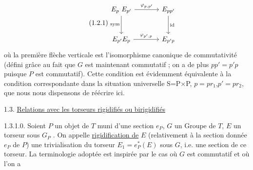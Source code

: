 \begin{equation}\tag{1.2.1}
\begin{tikzcd}[column sep=large, row sep=large]
E_p\ E_{p'} \arrow[r, "{\varphi_{p,p'}}"] \arrow[d, "\mathrm{sym}"'] & E_{pp'} \arrow[d, "\mathrm{id}"] \\
E_{p'}E_p \arrow[r, "{\varphi_{p',p}}"] & E_{p'p}
\end{tikzcd}
\end{equation}
où la première flèche verticale est l'isomorphisme canonique de commutativité (défini grâce au fait que $G$ est maintenant commutatif ; on a de plus $pp' = p'p$ puisque $P$ est commutatif). Cette condition est évidemment équivalente à la condition correspondante dans la situation universelle S=P$\times$P, $p=pr_1$,$p' = pr_2$, que nous nous dispensons de réécrire ici.


1.3.  \underline{Relations avec les torseurs rigidifiés ou birigidifiés}

1.3.1.0.  Soient $P$ un objet de $T$ muni d'une section $e_P$, $G$ un Groupe de \underline{$T$}, $E$ un torseur sous $G_P$ . On appelle \underline{rigidification de} $E$ (relativement à la section donnée $e_P$ de $P$) une trivialisation du torseur $E_1 = e_P^*(E)$ sous $G$,
i.e. une section de ce torseur. La terminologie adoptée est inspirée par le cas où $G$ est commutatif et où l'on a

